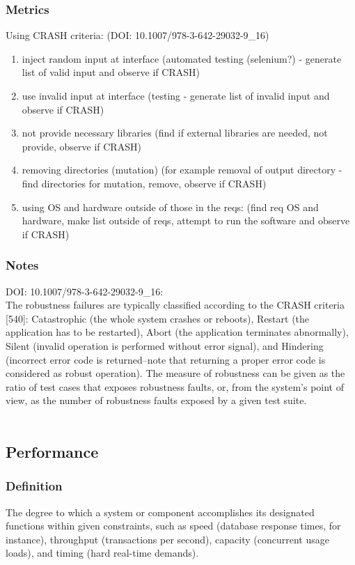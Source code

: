 \documentclass{article}
\begin{document}
\subsubsection{Metrics}
Using CRASH criteria: (DOI: 10.1007/978-3-642-29032-9\_16)
\begin{enumerate}
	\item inject random input at interface (automated testing (selenium?) - generate list of valid input and observe if CRASH)
	\item use invalid input at interface (testing - generate list of invalid input and observe if CRASH)
	\item not provide necessary libraries (find if external libraries are needed, not provide, observe if CRASH)
	\item removing directories (mutation) (for example removal of output directory - find directories for mutation, remove, observe if CRASH)
	\item using OS and hardware outside of those in the reqs: (find req OS and hardware, make list outside of reqs, attempt to run the software and observe if CRASH)
\end{enumerate}
\subsubsection{Notes}
DOI: 10.1007/978-3-642-29032-9\_16:\\ 
The robustness failures are typically classified according to the CRASH criteria [540]: Catastrophic (the whole system crashes or reboots), Restart (the application has to be restarted), Abort (the application terminates abnormally), Silent (invalid operation is performed without error signal), and Hindering (incorrect error code is returned–note that returning a proper error code is considered as robust operation). The measure of robustness can be given as the ratio of test cases that exposes robustness faults, or, from the system’s point of view, as the number of robustness faults exposed by a given test suite.\\ 

~\newpage

\subsection{Performance}
\subsubsection{Definition}
The degree to which a system or component accomplishes its designated functions within given constraints, such as speed (database response times, for instance), throughput (transactions per second), capacity (concurrent usage loads), and timing (hard real-time demands).
\end{document}
